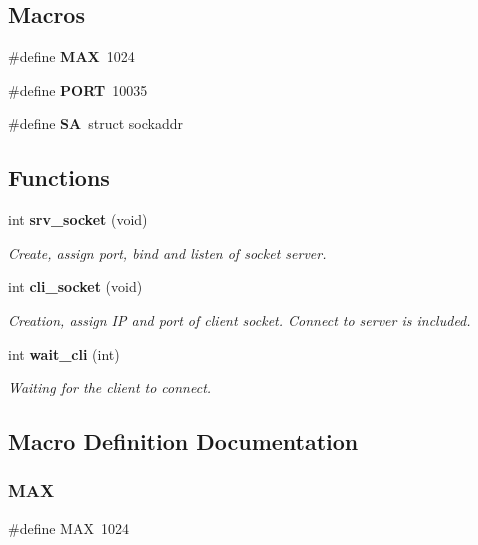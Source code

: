 \subsection*{Macros}
\begin{DoxyCompactItemize}
\item 
\#define \textbf{ M\+AX}~1024
\item 
\#define \textbf{ P\+O\+RT}~10035
\item 
\#define \textbf{ SA}~struct   sockaddr
\end{DoxyCompactItemize}
\subsection*{Functions}
\begin{DoxyCompactItemize}
\item 
int \textbf{ srv\+\_\+socket} (void)
\begin{DoxyCompactList}\small\item\em Create, assign port, bind and listen of socket server. \end{DoxyCompactList}\item 
int \textbf{ cli\+\_\+socket} (void)
\begin{DoxyCompactList}\small\item\em Creation, assign IP and port of client socket. Connect to server is included. \end{DoxyCompactList}\item 
int \textbf{ wait\+\_\+cli} (int)
\begin{DoxyCompactList}\small\item\em Waiting for the client to connect. \end{DoxyCompactList}\end{DoxyCompactItemize}


\subsection{Macro Definition Documentation}
\mbox{\label{socket_8h_a392fb874e547e582e9c66a08a1f23326}} 
\subsubsection{M\+AX}
{\footnotesize\ttfamily \#define M\+AX~1024}

\mbox{\label{socket_8h_a614217d263be1fb1a5f76e2ff7be19a2}} 
